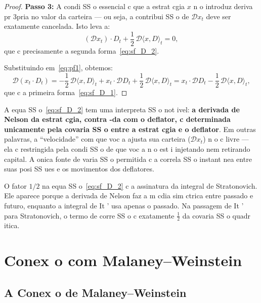{\begin{proof}
\textbf{Passo 3:} A condi SS o essencial c que a estrat cgia $x$ n o
introduz deriva pr 3pria no valor da carteira --- ou seja, a contribui SS o
de $\mathcal{D}x_t$ deve ser exatamente cancelada. Isto leva a:
\[
(\mathcal{D}x_t) \cdot D_t + \frac{1}{2}\,\mathcal{D}\langle x, D\rangle_t = 0,
\]
que c precisamente a segunda forma~\eqref{eq:sf_D_2}.

Substituindo em~\eqref{eq:pf1}, obtemos:
\[
\mathcal{D}(x_t \cdot D_t)
= -\frac{1}{2}\,\mathcal{D}\langle x, D\rangle_t
 + x_t \cdot \mathcal{D}D_t
 + \frac{1}{2}\,\mathcal{D}\langle x, D\rangle_t
= x_t \cdot \mathcal{D}D_t - \frac{1}{2}\,\mathcal{D}\langle x, D\rangle_t,
\]
que c a primeira forma~\eqref{eq:sf_D_1}.
\end{proof}

\begin{obs}
A equa SS o~\eqref{eq:sf_D_2} tem uma interpreta SS o not ivel: \textbf{a
derivada de Nelson da estrat cgia, contra -da com o deflator, c
determinada unicamente pela covaria SS o entre a estrat cgia e o deflator}.
Em outras palavras, a ``velocidade'' com que voc a ajusta sua carteira
($\mathcal{D}x_t$) n o c livre --- ela c restringida pela condi SS o de
que voc a n o est i injetando nem retirando capital. A onica fonte de
varia SS o permitida c a correla SS o instant nea entre suas posi SS ues e os
movimentos dos deflatores.
\end{obs}

\begin{obs}
O fator $1/2$ na equa SS o~\eqref{eq:sf_D_2} c a assinatura da
integral de Stratonovich. Ele aparece porque a derivada de Nelson
faz a m cdia sim ctrica entre passado e futuro, enquanto a integral de
It ' usa apenas o passado. Na passagem de It ' para Stratonovich, o
termo de corre SS o c exatamente $\frac{1}{2}$ da covaria SS o quadr itica.
\end{obs}

\section{Conex o com Malaney--Weinstein}

\subsection{A Conex o de Malaney--Weinstein}

}
